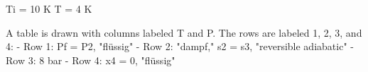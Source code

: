 Ti = 10 K  
T = 4 K  

A table is drawn with columns labeled T and P. The rows are labeled 1, 2, 3, and 4:  
- Row 1: Pf = P2, "flüssig"  
- Row 2: "dampf," s2 = s3, "reversible adiabatic"  
- Row 3: 8 bar  
- Row 4: x4 = 0, "flüssig"